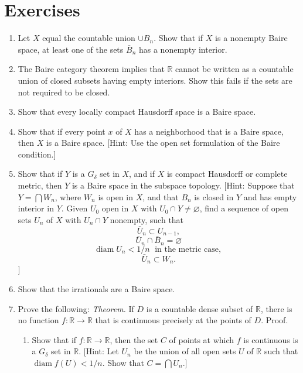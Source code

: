 \section*{Exercises}
\begin{enumerate}[itemsep=0.4em, parsep=0pt, topsep=0pt, partopsep=0pt, leftmargin=*, label=\arabic*., ref=\arabic*]
\item Let \(X\) equal the countable union \(\cup {B}_{n}\). Show that if \(X\) is a nonempty Baire space, at least one of the sets \(\bar{B}_{n}\) has a nonempty interior.
\item The Baire category theorem implies that \(\mathbb{R}\) cannot be written as a countable union of closed subsets having empty interiors. Show this fails if the sets are not required to be closed.
\item Show that every locally compact Hausdorff space is a Baire space.
\item Show that if every point \(x\) of \(X\) has a neighborhood that is a Baire space, then \(X\) is a Baire space. [Hint: Use the open set formulation of the Baire condition.]
\item Show that if \(Y\) is a \(G_{\delta }\) set in \(X\), and if \(X\) is compact Hausdorff or complete metric, then \(Y\) is a Baire space in the subspace topology. [Hint: Suppose that \(Y = \bigcap {W}_{n}\), where \(W_{n}\) is open in \(X\), and that \(B_{n}\) is closed in \(Y\) and has empty interior in \(Y\). Given \(U_{0}\) open in \(X\) with \(U_{0} \cap Y \neq \varnothing\), find a sequence of open sets \(U_{n}\) of \(X\) with \(U_{n} \cap Y\) nonempty, such that \[ \bar{U}_{n} \subset {U}_{n - 1}, \] \[ \bar{U}_{n} \cap {\bar{B}}_{n} = \varnothing \] \[ \operatorname{diam}U_{n} < 1/n\;\text{ in the metric case, } \] \[ \bar{U}_{n} \subset {W}_{n}. \]]
\item Show that the irrationals are a Baire space.
\item Prove the following: \textsl{Theorem.} If \(D\) is a countable dense subset of \(\mathbb{R}\), there is no function \(f : \mathbb{R} \rightarrow \mathbb{R}\) that is continuous precisely at the points of \(D\). Proof.
 \begin{enumerate}[itemsep=0.2em, parsep=0pt, topsep=0pt, partopsep=0pt, leftmargin=*, label=(\alph*), align=left]
 \item Show that if \(f : \mathbb{R} \rightarrow \mathbb{R}\), then the set \(C\) of points at which \(f\) is continuous is a \(G_{\delta }\) set in \(\mathbb{R}\). [Hint: Let \(U_{n}\) be the union of all open sets \(U\) of \(\mathbb{R}\) such that \(\operatorname{diam}f( U) < 1/n\). Show that \(C = \bigcap {U}_{n}\).]

\end{enumerate}
\end{enumerate}
